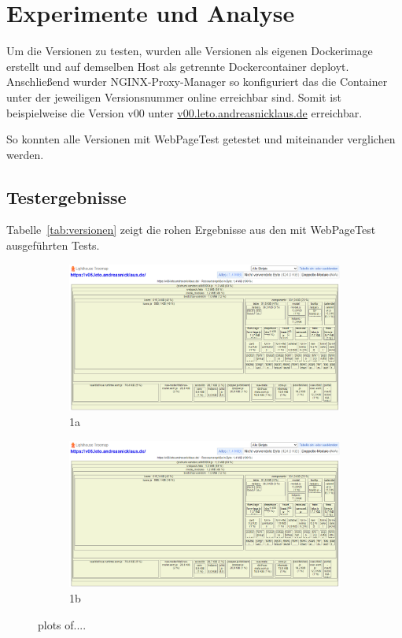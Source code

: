 \documentclass[11pt,a4paper]{article}
\begin{document}
\section{Experimente und Analyse}\label{sec:experimente}
Um die Versionen zu testen, wurden alle Versionen als eigenen Dockerimage erstellt und auf demselben Host als getrennte Dockercontainer deployt.
Anschließend wurder NGINX-Proxy-Manager so konfiguriert das die Container unter der jeweiligen Versionsnummer online erreichbar sind.
Somit ist beispielweise die Version v00 unter \href{https://v00.leto.andreasnicklaus.de}{v00.leto.andreasnicklaus.de} erreichbar.

So konnten alle Versionen mit WebPageTest getestet und miteinander verglichen werden.

\subsection{Testergebnisse}
Tabelle~\ref{tab:versionen} zeigt die rohen Ergebnisse aus den mit WebPageTest ausgeführten Tests.

\begin{figure}
  \begin{subfigure}{.5\textwidth}
    \centering
    \includegraphics[width=.8\linewidth]{images/v06_treemap.png}
    \caption{1a}
    \label{fig:sfig1}
  \end{subfigure}%
  \begin{subfigure}{.5\textwidth}
    \centering
    \includegraphics[width=.8\linewidth]{images/v06_treemap.png}
    \caption{1b}
    \label{fig:sfig2}
  \end{subfigure}
  \caption{plots of....}
  \label{fig:fig}
  \end{figure}
\end{document}
